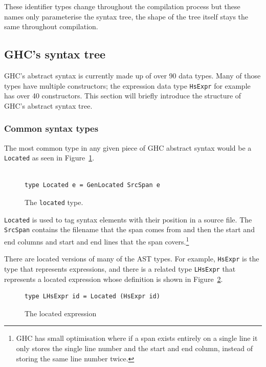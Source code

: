These identifier types change throughout the compilation process but these names only parameterise the syntax tree, the shape of the tree itself stays the same throughout compilation. 

\subsection{GHC's syntax tree}
GHC's abstract syntax is currently made up of over 90 data types. Many of those types have multiple constructors; the expression data type \texttt{HsExpr} for example has over 40 constructors. This section will briefly introduce the structure of GHC's abstract syntax tree.

\subsubsection{Common syntax types}

The most common type in any given piece of GHC abstract syntax would be a \texttt{Located} as seen in Figure~\ref{located}.

\begin{figure}[t]
\begin{lstlisting}

type Located e = GenLocated SrcSpan e

\end{lstlisting}
\caption{The \texttt{located} type.}
\label{located}
\end{figure}

\texttt{Located} is used to tag syntax elements with their position in a source file. The \texttt{SrcSpan} contains the filename that the span comes from and then the start and end columns and start and end lines that the span covers.\footnote{GHC has small optimisation where if a span exists entirely on a single line it only stores the single line number and the start and end column, instead of storing the same line number twice.} 

There are located versions of many of the AST types. For example, \texttt{HsExpr} is the type that represents expressions, and there is a related type \texttt{LHsExpr} that represents a located expression whose definition is shown in Figure~\ref{lhsexpr}.

\begin{figure}[t]
\begin{lstlisting}
type LHsExpr id = Located (HsExpr id)
\end{lstlisting}
\caption{The located expression}
\label{lhsexpr}
\end{figure}

